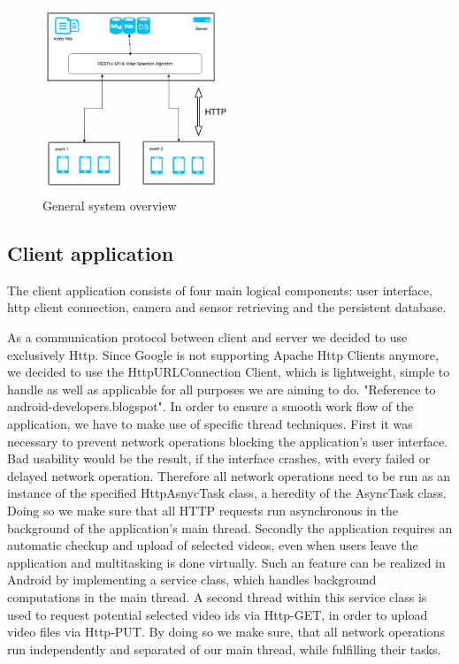 \documentclass[conference]{IEEEtran}
\begin{document}
\begin{figure}[!t]
	\centering
	\includegraphics[width=0.5\textwidth]{overview.jpg}
	\caption{General system overview}
	\label{fig:gen_arch}
\end{figure}


\subsection{Client application}

The client application consists of four main logical components: user interface, http client connection, camera and sensor retrieving and the persistent database.

As a communication protocol between client and server we decided to use exclusively Http. Since Google is not supporting Apache Http Clients anymore, 
we decided to use the HttpURLConnection Client, which is lightweight, simple to handle as well as applicable for all purposes we are aiming to do. "Reference to android-developers.blogspot".
In order to ensure a smooth work flow of the application, we have to make use of specific thread techniques.
First it was necessary to prevent network operations blocking the application's user interface. Bad usability would be the result, 
if the interface crashes, with every failed or delayed network operation. Therefore all network operations need to be run as an instance 
of the specified HttpAsnycTask class, a heredity of the AsyncTask class. Doing so we make sure that all HTTP requests run asynchronous in 
the background of the application's main thread.
Secondly the application requires an automatic checkup and upload of selected videos, even when users leave the application and multitasking 
is done virtually. Such an feature can be realized in Android by implementing a service class, which handles background computations in the main 
thread. A second thread within this service class is used to request potential selected video ids via Http-GET, in order to upload video files via Http-PUT.
By doing so we make sure, that all network operations run independently and separated of our main thread, while fulfilling their tasks.
\end{document}
